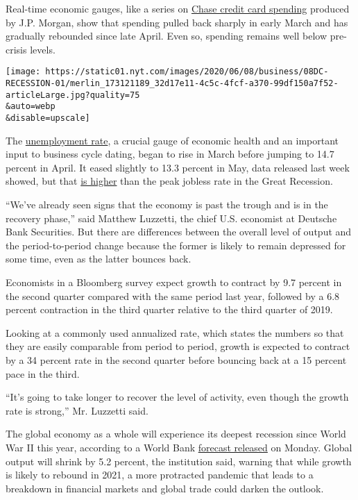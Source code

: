 Real-time economic gauges, like a series on
\href{https://markets.jpmorgan.com/research/open/latest/publication/9002054}{Chase
credit card spending} produced by J.P. Morgan, show that spending pulled
back sharply in early March and has gradually rebounded since late
April. Even so, spending remains well below pre-crisis levels.

\texttt{[image: https://static01.nyt.com/images/2020/06/08/business/08DC-RECESSION-01/merlin\_173121189\_32d17e11-4c5c-4fcf-a370-99df150a7f52-articleLarge.jpg?quality=75\\\&auto=webp\\\&disable=upscale]}

The \href{https://fred.stlouisfed.org/series/UNRATE}{unemployment rate},
a crucial gauge of economic health and an important input to business
cycle dating, began to rise in March before jumping to 14.7 percent in
April. It eased slightly to 13.3 percent in May, data released last week
showed, but that
\href{https://www.nytimes.com/2020/06/05/business/economy/jobs-report.html}{is
higher} than the peak jobless rate in the Great Recession.

``We've already seen signs that the economy is past the trough and is in
the recovery phase,'' said Matthew Luzzetti, the chief U.S. economist at
Deutsche Bank Securities. But there are differences between the overall
level of output and the period-to-period change because the former is
likely to remain depressed for some time, even as the latter bounces
back.

Economists in a Bloomberg survey expect growth to contract by 9.7
percent in the second quarter compared with the same period last year,
followed by a 6.8 percent contraction in the third quarter relative to
the third quarter of 2019.

Looking at a commonly used annualized rate, which states the numbers so
that they are easily comparable from period to period, growth is
expected to contract by a 34 percent rate in the second quarter before
bouncing back at a 15 percent pace in the third.

``It's going to take longer to recover the level of activity, even
though the growth rate is strong,'' Mr. Luzzetti said.

The global economy as a whole will experience its deepest recession
since World War II this year, according to a World Bank
\href{https://www.worldbank.org/en/publication/global-economic-prospects}{forecast
released} on Monday. Global output will shrink by 5.2 percent, the
institution said, warning that while growth is likely to rebound in
2021, a more protracted pandemic that leads to a breakdown in financial
markets and global trade could darken the outlook.


